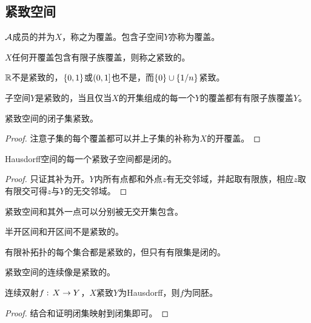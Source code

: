 \documentclass{ctexrep}
\begin{document}
  \subsection{紧致空间}
  \begin{definition}
    $\mathcal{A}$成员的并为$X$，称之为覆盖。包含子空间$Y$亦称为覆盖。
  \end{definition}
  \begin{definition}
    $X$任何开覆盖包含有限子族覆盖，则称之紧致的。
  \end{definition}
  \begin{ex}
    $\mathbb{R}$不是紧致的，$\left\{0,1\right\}$或$\left(0,1\right]$也不是，而$\left\{0\right\}\cup\left\{1/n\right\}$紧致。
  \end{ex}
  \begin{lemma}
    子空间$Y$是紧致的，当且仅当$X$的开集组成的每一个$Y$的覆盖都有有限子族覆盖$Y$。
  \end{lemma}
  \begin{theorem}
    紧致空间的闭子集紧致。
  \end{theorem}
  \begin{proof}
    注意子集的每个覆盖都可以并上子集的补称为$X$的开覆盖。
  \end{proof}
  \begin{theorem}
    \label{thm:hauscompact}
    Hausdorff空间的每一个紧致子空间都是闭的。
  \end{theorem}
  \begin{proof}
    只证其补为开。$Y$内所有点都和外点$z$有无交邻域，并起取有限族，相应$z$取有限交可得$z$与$Y$的无交邻域。
  \end{proof}
  \begin{lemma}
    紧致空间和其外一点可以分别被无交开集包含。
  \end{lemma}
  \begin{ex}
    半开区间和开区间不是紧致的。
  \end{ex}
  \begin{ex}
    有限补拓扑的每个集合都是紧致的，但只有有限集是闭的。
  \end{ex}
  \begin{theorem}
    \label{thm:imagecompact}
    紧致空间的连续像是紧致的。 
  \end{theorem}
  \begin{theorem}
    \label{thm:compacthomo}
    连续双射$f:\, X \rightarrow Y$，$X$紧致$Y$为Hausdorff，则$f$为同胚。
  \end{theorem}
  \begin{proof}
    结合和证明闭集映射到闭集即可。
  \end{proof}
\end{document}
